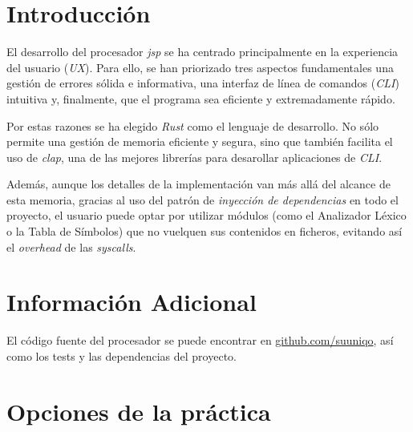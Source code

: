 \documentclass[a4paper]{CSMakotoTechnicalReport}
\begin{document}
\begin{multicols}{2} %


    \renewcommand{\contentsname}{Índice}
    \tableofcontents


    \section{Introducción}

    El desarrollo del procesador \textit{jsp} se ha centrado principalmente en la experiencia del usuario (\textit{UX}). Para ello, se han priorizado tres aspectos fundamentales una gestión de errores sólida e informativa, una interfaz de línea de comandos (\textit{CLI}) intuitiva y, finalmente, que el programa sea eficiente y extremadamente rápido.

    Por estas razones se ha elegido \textit{Rust} como el lenguaje de desarrollo. No sólo permite una gestión de memoria eficiente y segura, sino que también facilita el uso de \textit{clap}, una de las mejores librerías para desarollar aplicaciones de \textit{CLI}.

    Además, aunque los detalles de la implementación van más allá del alcance de esta memoria, gracias al uso del patrón de \textit{inyección de dependencias} en todo el proyecto, el usuario puede optar por utilizar módulos (como el Analizador Léxico o la Tabla de Símbolos) que no vuelquen sus contenidos en ficheros, evitando así el \textit{overhead} de las \textit{syscalls}.

    \section{Información Adicional}

    El código fuente del procesador se puede encontrar en \href{https://www.github.com/suuniqo}{github.com/suuniqo}, así como los tests y las dependencias del proyecto.

    \section{Opciones de la práctica}


\end{multicols}
\end{document}
